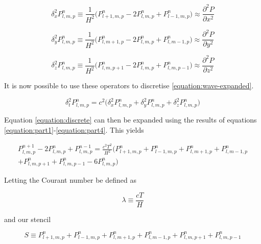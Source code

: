 \documentclass[12pt,a4paper]{report}
\begin{document}
\begin{equation}
\label{equation:part2}
\delta_{x}^{2} P_{l,m,p}^{n} \equiv \frac{1}{H^{2}} \Big(P_{l+1,m,p}^{n} - 2 P_{l,m,p}^{n} + P_{l-1,m,p}^{n}\Big) \approx \frac{{\partial ^2 P}}{{\partial x^2 }}
\end{equation}

\begin{equation}
\label{equation:part3}
\delta_{y}^{2} P_{l,m,p}^{n} \equiv \frac{1}{H^{2}} \Big(P_{l,m+1,p}^{n} - 2 P_{l,m,p}^{n} + P_{l,m-1,p}^{n}\Big) \approx \frac{{\partial ^2 P}}{{\partial y^2 }}
\end{equation}

\begin{equation}
\label{equation:part4}
\delta_{z}^{2} P_{l,m,p}^{n} \equiv \frac{1}{H^{2}} \Big(P_{l,m,p+1}^{n} - 2 P_{l,m,p}^{n} + P_{l,m,p-1}^{n}\Big) \approx \frac{{\partial ^2 P}}{{\partial z^2 }}
\end{equation}

It is now possible to use these operators to discretise \ref{equation:wave-expanded}.

\begin{equation}
\label{equation:discrete}
\delta_{t}^{2} P_{l,m,p}^{n} = c^2 \big(\delta_{x}^{2} P_{l,m,p}^{n} + \delta_{y}^{2} P_{l,m,p}^{n} + \delta_{z}^{2} P_{l,m,p}^{n} \big)
\end{equation}

Equation \ref{equation:discrete} can then be expanded using the results of equations \ref{equation:part1}-\ref{equation:part4}. This yields

\begin{multline}
\label{equation:stencil-big}
P_{l,m,p}^{n+1} - 2 P_{l,m,p}^{n} + P_{l,m,p}^{n-1} = \frac{c^2 T^2}{H^2} \big(P_{l+1,m,p}^{n} + P_{l-1,m,p}^{n} + P_{l,m+1,p}^{n} + P_{l,m-1,p}^{n} \\ 
+ P_{l,m,p+1}^{n} + P_{l,m,p-1}^{n} - 6 P_{l,m,p}^{n} \big)
\end{multline}

Letting the Courant number be defined as 

\begin{equation}
\lambda \equiv \frac{c T}{H}
\end{equation}

and our stencil 

\begin{equation}
\label{equation:s-define}
S \equiv P_{l+1,m,p}^{n} + P_{l-1,m,p}^{n} + P_{l,m+1,p}^{n} + P_{l,m-1,p}^{n} + P_{l,m,p+1}^{n} + P_{l,m,p-1}^{n}
\end{equation}
\end{document}
